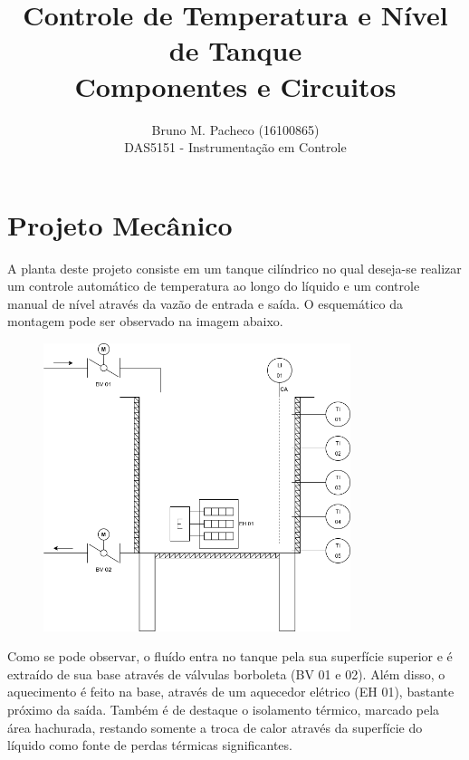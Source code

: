 \documentclass[a4paper]{report}
\begin{document}
 
\title{Controle de Temperatura e Nível de Tanque\\Componentes e Circuitos}
\author{Bruno M. Pacheco (16100865) \\
DAS5151 - Instrumentação em Controle}
 
\maketitle

\section*{Projeto Mecânico}

A planta deste projeto consiste em um tanque cilíndrico no qual deseja-se realizar um controle automático de temperatura ao longo do líquido e um controle manual de nível através da vazão de entrada e saída. O esquemático da montagem pode ser observado na imagem abaixo.

\begin{figure}[H]
    \centering
    \includegraphics[width=0.8\textwidth]{figures/tank.png}
\end{figure}

Como se pode observar, o fluído entra no tanque pela sua superfície superior e é extraído de sua base através de válvulas borboleta (BV 01 e 02). Além disso, o aquecimento é feito na base, através de um aquecedor elétrico (EH 01), bastante próximo da saída. Também é de destaque o isolamento térmico, marcado pela área hachurada, restando somente a troca de calor através da superfície do líquido como fonte de perdas térmicas significantes.
\end{document}
